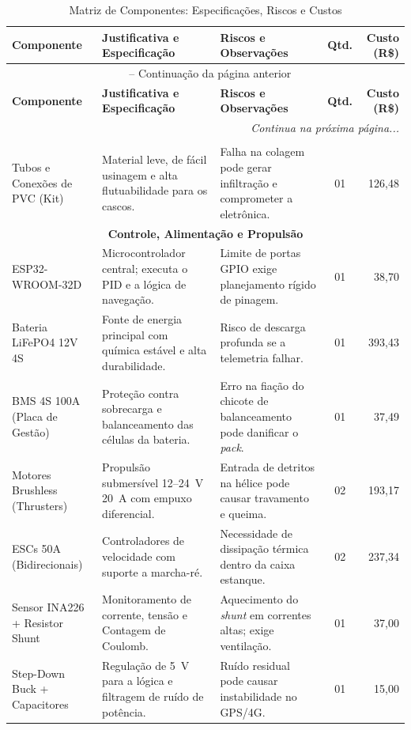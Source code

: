 \documentclass[12pt,a4paper]{article}
\begin{document}
\renewcommand{\arraystretch}{1.3}
\footnotesize
\begin{longtable}{|p{2.8cm}|p{5.0cm}|p{4.0cm}|c|r|}
\caption{Matriz de Componentes: Especificações, Riscos e Custos}
\label{tab:componentes_riscos} \\
\hline
\textbf{Componente} & \textbf{Justificativa e Especificação} & \textbf{Riscos e Observações} & \textbf{Qtd.} & \textbf{Custo (R\$)} \\ \hline
\endfirsthead
\multicolumn{5}{c}{{\tablename\ \thetable{} -- Continuação da página anterior}} \\
\hline
\textbf{Componente} & \textbf{Justificativa e Especificação} & \textbf{Riscos e Observações} & \textbf{Qtd.} & \textbf{Custo (R\$)} \\ \hline
\endhead
\hline \multicolumn{5}{|r|}{\textit{Continua na próxima página...}} \\ \hline
\endfoot
\hline
\endlastfoot

\multicolumn{5}{|c|}{\textbf{Estrutura Física}} \\ \hline
Tubos e Conexões de PVC (Kit) & Material leve, de fácil usinagem e alta flutuabilidade para os cascos. & Falha na colagem pode gerar infiltração e comprometer a eletrônica. & 01 & 126,48 \\ \hline

\multicolumn{5}{|c|}{\textbf{Controle, Alimentação e Propulsão}} \\ \hline
ESP32-WROOM-32D & Microcontrolador central; executa o PID e a lógica de navegação. & Limite de portas GPIO exige planejamento rígido de pinagem. & 01 & 38,70 \\ \hline
Bateria LiFePO4 12V 4S & Fonte de energia principal com química estável e alta durabilidade. & Risco de descarga profunda se a telemetria falhar. & 01 & 393,43 \\ \hline
BMS 4S 100A (Placa de Gestão) & Proteção contra sobrecarga e balanceamento das células da bateria. & Erro na fiação do chicote de balanceamento pode danificar o \textit{pack}. & 01 & 37,49 \\ \hline
Motores Brushless (Thrusters) & Propulsão submersível 12--24~V 20~A com empuxo diferencial. & Entrada de detritos na hélice pode causar travamento e queima. & 02 & 193,17 \\ \hline
ESCs 50A (Bidirecionais) & Controladores de velocidade com suporte a marcha-ré. & Necessidade de dissipação térmica dentro da caixa estanque. & 02 & 237,34 \\ \hline
Sensor INA226 + Resistor Shunt & Monitoramento de corrente, tensão e Contagem de Coulomb. & Aquecimento do \textit{shunt} em correntes altas; exige ventilação. & 01 & 37,00 \\ \hline
Step-Down Buck + Capacitores & Regulação de 5~V para a lógica e filtragem de ruído de potência. & Ruído residual pode causar instabilidade no GPS/4G. & 01 & 15,00 \\ \hline


\end{longtable}
\end{document}
